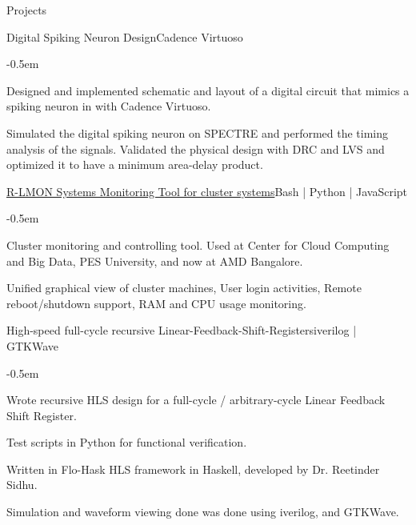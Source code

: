 \documentclass{CV} %
\begin{document}
\begin{rSection}{Projects}
  \begin{rSubsection}{Digital Spiking Neuron Design}{}{Cadence Virtuoso}{}
    \begin{list}{}{\footnotesize}\itemsep -0.5em \vspace{-0.5em}
    \item Designed and implemented schematic and layout of a digital circuit that mimics a spiking neuron in with Cadence Virtuoso.
    \item Simulated the digital spiking neuron on SPECTRE and performed the timing analysis of the signals. Validated the physical design with DRC and LVS and optimized it to have a minimum area-delay product.
    \end{list}
  \end{rSubsection}

\newpage
  
  \begin{rSubsection}{\href{https://github.com/SofDevs-Do/R-LMON}{R-LMON Systems Monitoring Tool for cluster systems}}{}{Bash | Python | JavaScript}{}
    \begin{list}{}{\footnotesize}\itemsep -0.5em \vspace{-0.5em}
      \item Cluster monitoring and controlling tool. Used at Center for Cloud Computing and Big Data, PES University, and now at AMD Bangalore.
      \item Unified graphical view of cluster machines, User login activities, Remote reboot/shutdown support, RAM and CPU usage monitoring.
    \end{list}
  \end{rSubsection}

  \begin{rSubsection}{High-speed full-cycle recursive Linear-Feedback-Shift-Registers}{}{iverilog | GTKWave}{}
    \begin{list}{}{\footnotesize}\itemsep -0.5em \vspace{-0.5em}
    \item Wrote recursive HLS design for a full-cycle / arbitrary-cycle Linear Feedback Shift Register.
    \item Test scripts in Python for functional verification.
    \item Written in Flo-Hask HLS framework in Haskell, developed by Dr. Reetinder Sidhu.
    \item Simulation and waveform viewing done was done using iverilog, and GTKWave.
    \end{list}
  \end{rSubsection}


\end{rSection}
\end{document}
